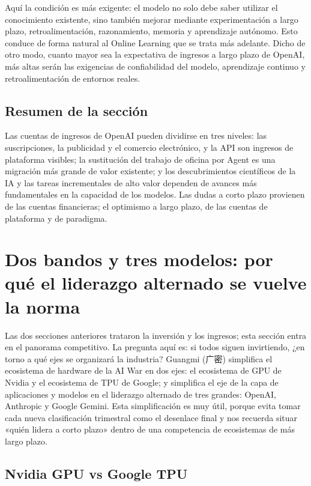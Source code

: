 \documentclass[a4paper]{article}
\begin{document}
Aquí la condición es más exigente: el modelo no solo debe saber utilizar el conocimiento existente, sino también mejorar mediante experimentación a largo plazo, retroalimentación, razonamiento, memoria y aprendizaje autónomo. Esto conduce de forma natural al Online Learning que se trata más adelante. Dicho de otro modo, cuanto mayor sea la expectativa de ingresos a largo plazo de OpenAI, más altas serán las exigencias de confiabilidad del modelo, aprendizaje continuo y retroalimentación de entornos reales.

\subsection{Resumen de la sección}

Las cuentas de ingresos de OpenAI pueden dividirse en tres niveles: las suscripciones, la publicidad y el comercio electrónico, y la API son ingresos de plataforma visibles; la sustitución del trabajo de oficina por Agent es una migración más grande de valor existente; y los descubrimientos científicos de la IA y las tareas incrementales de alto valor dependen de avances más fundamentales en la capacidad de los modelos. Las dudas a corto plazo provienen de las cuentas financieras; el optimismo a largo plazo, de las cuentas de plataforma y de paradigma.
\section{Dos bandos y tres modelos: por qué el liderazgo alternado se vuelve la norma}

Las dos secciones anteriores trataron la inversión y los ingresos; esta sección entra en el panorama competitivo. La pregunta aquí es: si todos siguen invirtiendo, ¿en torno a qué ejes se organizará la industria? Guangmi (广密) simplifica el ecosistema de hardware de la AI War en dos ejes: el ecosistema de GPU de Nvidia y el ecosistema de TPU de Google; y simplifica el eje de la capa de aplicaciones y modelos en el liderazgo alternado de tres grandes: OpenAI, Anthropic y Google Gemini. Esta simplificación es muy útil, porque evita tomar cada nueva clasificación trimestral como el desenlace final y nos recuerda situar «quién lidera a corto plazo» dentro de una competencia de ecosistemas de más largo plazo.

\subsection{Nvidia GPU vs Google TPU}
\end{document}
